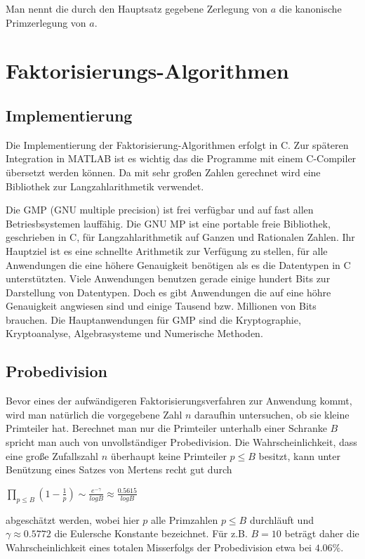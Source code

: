 \documentclass[a4paper,11pt]{article}
\begin{document}
Man nennt die durch den Hauptsatz gegebene Zerlegung von $a$ die
kanonische Primzerlegung von $a$.

\newpage

\section{Faktorisierungs-Algorithmen}
\subsection{Implementierung}
Die Implementierung der Faktorisierung-Algorithmen erfolgt in C. Zur
späteren Integration in MATLAB ist es wichtig das die Programme mit
einem C-Compiler übersetzt werden können. Da mit sehr großen Zahlen
gerechnet wird eine Bibliothek zur Langzahlarithmetik verwendet.

Die GMP (GNU multiple precision) ist frei verfügbar und auf fast allen
Betriesbsystemen lauffähig. Die GNU MP ist eine portable freie Bibliothek,
geschrieben in C, für Langzahlarithmetik auf Ganzen und Rationalen Zahlen.
Ihr Hauptziel ist es eine schnellte Arithmetik zur Verfügung zu stellen,
für alle Anwendungen die eine höhere Genauigkeit benötigen als es die
Datentypen in C unterstützten.
Viele Anwendungen benutzen gerade einige hundert Bits zur Darstellung
von Datentypen. Doch es gibt Anwendungen die auf eine höhre Genauigkeit
angwiesen sind und einige Tausend bzw. Millionen von Bits brauchen. Die
Hauptanwendungen für GMP sind die Kryptographie, Kryptoanalyse,
Algebrasysteme und Numerische Methoden.

\subsection{Probedivision}
Bevor eines der aufwändigeren Faktorisierungsverfahren zur Anwendung
kommt, wird man natürlich die vorgegebene Zahl $n$ daraufhin
untersuchen, ob sie kleine Primteiler hat. Berechnet man nur die
Primteiler unterhalb einer Schranke $B$ spricht man auch von
unvollständiger Probedivision. Die Wahrscheinlichkeit, dass eine
große Zufallszahl $n$ überhaupt keine Primteiler $p\leq B$ besitzt,
kann unter Benützung eines Satzes von Mertens recht gut durch
\begin{center}
$ \prod_{p\leq B} (1- \frac{1}{p})\sim \frac{e^{-\gamma}}{log B} \approx
\frac{0.5615}{log B}$
\end{center}
abgeschätzt werden, wobei hier $p$ alle Primzahlen $p\leq B$ durchläuft und
$\gamma \approx 0.5772$ die Eulersche Konstante bezeichnet. Für z.B. $B=10$
beträgt daher die Wahrscheinlichkeit eines totalen Misserfolgs der
Probedivision etwa bei $4.06\%$.
\end{document}
